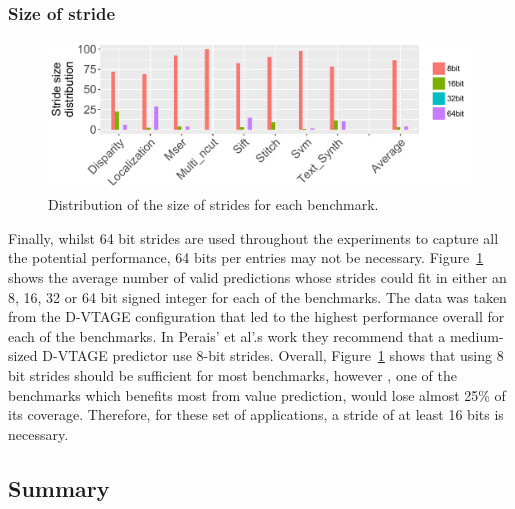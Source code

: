 \subsubsection{Size of stride}

\begin{figure}[t]
    \centering
    \includegraphics[width=1\textwidth]{chapter3/graphics/strides.pdf}
    \caption{Distribution of the size of strides for each benchmark.}
    \label{fig:strides}
	\vspace{1em}
\end{figure}

Finally, whilst 64 bit strides are used throughout the experiments to capture all the potential performance, 64 bits per entries may not be necessary.
Figure~\ref{fig:strides} shows the average number of valid predictions whose strides could fit in either an 8, 16, 32 or 64 bit signed integer for each of the benchmarks.
The data was taken from the D-VTAGE configuration that led to the highest performance overall for each of the benchmarks.
In Perais' et al'.s work they recommend that a medium-sized D-VTAGE predictor use 8-bit strides.
Overall, Figure~\ref{fig:strides} shows that using 8 bit strides should be sufficient for most benchmarks, however , one of the benchmarks which benefits most from value prediction, would lose almost 25\% of its coverage.
Therefore, for these set of applications, a stride of at least 16 bits is necessary.

\subsection{Summary}
